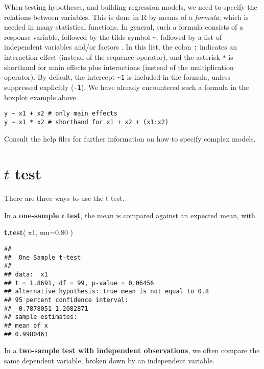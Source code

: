 \documentclass[]{book}
\newenvironment{Shaded}{\begin{snugshade}}{\end{snugshade}}
\newcommand{\DataTypeTok}[1]{\textcolor[rgb]{0.13,0.29,0.53}{#1}}
\newcommand{\FloatTok}[1]{\textcolor[rgb]{0.00,0.00,0.81}{#1}}
\newcommand{\KeywordTok}[1]{\textcolor[rgb]{0.13,0.29,0.53}{\textbf{#1}}}
\newcommand{\NormalTok}[1]{#1}
\begin{document}
When testing hypotheses, and building regression models, we need to
specify the relations between variables. This is done in
R by means of a \emph{formula}, which is needed in many
statistical functions. In general, such a formula consists of a
response variable, followed by the tilde symbol
{\texttt{\textasciitilde{}}}, followed by a list of independent
variables and/or factors \citep{wilk73}.
In this list, the colon
\texttt{:} indicates an interaction effect (instead
of the sequence operator), and the asterisk
\texttt{*} is shorthand for main effects plus
interactions (instead of the multiplication operator).
By default,
the intercept \texttt{\textasciitilde{}1} is included in the
formula, unless suppressed explicitly
(\texttt{-1}). We have already encountered such a formula
in the boxplot example above.

\begin{verbatim}
y ~ x1 + x2 # only main effects 
y ~ x1 * x2 # shorthand for x1 + x2 + (x1:x2) 
\end{verbatim}

Consult the help files for further information on how to specify
complex models.

\hypertarget{t-test}{%
\section{\texorpdfstring{\(t\) test}{t test}}\label{t-test}}

There are three ways to use the t test.

In a \textbf{one-sample \(t\) test}, the mean is compared against an expected mean,
with

\begin{Shaded}
\begin{Highlighting}[]
\KeywordTok{t.test}\NormalTok{( x1, }\DataTypeTok{mu=}\FloatTok{0.80}\NormalTok{ )}
\end{Highlighting}
\end{Shaded}

\begin{verbatim}
## 
##  One Sample t-test
## 
## data:  x1
## t = 1.8691, df = 99, p-value = 0.06456
## alternative hypothesis: true mean is not equal to 0.8
## 95 percent confidence interval:
##  0.7878051 1.2082871
## sample estimates:
## mean of x 
## 0.9980461
\end{verbatim}

In a \textbf{two-sample test with independent observations}, we often compare
the same dependent variable, broken down by an independent
variable.
\end{document}
